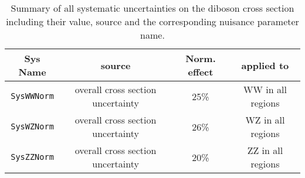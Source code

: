 \begin{table}[!htbp]\captionsetup{justification=centering}
\caption{Summary of all systematic uncertainties on the diboson cross section including their value, source and the corresponding nuisance parameter name. } 
\small
\centering
\begin{tabular}{ c || c | c | c  }
\hline
\hline
Sys Name  & source & Norm. effect & applied to \\
\hline
\texttt{SysWWNorm} 		&  overall cross section uncertainty	&  25\% 	& WW in all regions 	\\
\hline	
\texttt{SysWZNorm} 			&  overall cross section uncertainty	&  26\% 	& WZ in all regions 	\\
\hline
\texttt{SysZZNorm} 			&  overall cross section uncertainty	&  20\% 	& ZZ in all regions 	\\
\hline
\hline
\end{tabular}
\label{tab:DibOverall}
\end{table}



